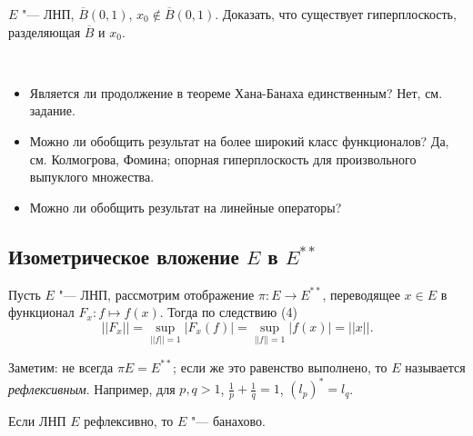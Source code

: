 \documentclass[main]{subfiles}
\begin{document}
\begin{exercise}
  $E$ "--- ЛНП, $\overline{B}(0, 1)$, $x_0 \notin \overline{B}(0, 1)$.
  Доказать, что существует гиперплоскость, разделяющая $\overline{B}$
  и $x_0$.
\end{exercise}

\begin{remark}~
  \begin{itemize}
    \item Является ли продолжение в теореме Хана-Банаха
      единственным? Нет, см. задание.
    \item Можно ли обобщить результат на более широкий класс
      функционалов? Да, см. Колмогрова, Фомина;
      опорная гиперплоскость для произвольного выпуклого множества.
    \item Можно ли обобщить результат на линейные операторы?
  \end{itemize}
\end{remark}

\subsection{Изометрическое вложение $E$ в $E^{**}$}
Пусть $E$ "--- ЛНП, рассмотрим отображение $\pi : E \to E^{**}$,
переводящее $x \in E$ в функционал $F_x : f \mapsto f(x)$.
Тогда по следствию (4)
\[
  ||F_x|| = \sup_{||f|| = 1} |F_x(f)| =
  \sup_{||f|| = 1} |f(x)| = ||x||.
\]

Заметим: не всегда $\pi E = E^{**}$; если же это равенство выполнено,
то $E$ называется \emph{рефлексивным}. Например, для $p, q > 1$,
$\frac1p + \frac1q = 1$, $(l_p)^* = l_q$.

\begin{exercise}
  Если ЛНП $E$ рефлексивно, то $E$ "--- банахово.
\end{exercise}
\end{document}
